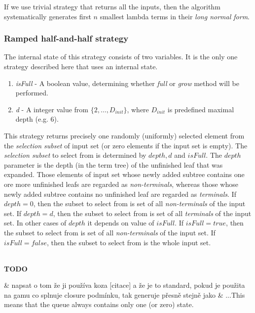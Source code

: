 \documentclass{llncs}
\newcommand{\setDots}[2]{ \lbrace #1 , \dots , #2 \rbrace}
\newenvironment{todo}
{~\\ {\color{red}\textbf{TODO}}
  \begin{easylist}[itemize]}
{ \end{easylist}}
\begin{document}
If we use trivial strategy that returns all the inputs, 
then the algorithm systematically generates 
first $n$ smallest lambda terms in their
\textit{long normal form}.

\subsubsection{Ramped half-and-half strategy}

The internal state of this strategy consists of two variables.
It is the only one strategy described here that uses an internal state.

\begin{enumerate}
 \item \textit{isFull} - A boolean value, determining whether \textit{full}
                     or \textit{grow} method will be performed.
 \item \textit{d} - A integer value from $\setDots{2}{D_{init}}$, where 
                $D_{init}$ is predefined maximal depth (e.g. 6).                    
\end{enumerate}

This strategy returns precisely one randomly
(uniformly) selected  element from 
the \textit{selection subset} of input set
(or zero elements if the input set is empty). 
The \textit{selection subset} 
to select from is determined by $depth, d$ and $isFull$.
The $depth$ parameter is the depth (in the term tree) 
of the unfinished leaf that was expanded.
Those elements of input set whose newly added subtree contains one ore more 
unfinished leafs are regarded as \textit{non-terminals}, whereas 
those whose newly added subtree contains no unfinished leaf are regarded as 
\textit{terminals}.
If $depth = 0$, then the subset to select from is  
set of all \textit{non-terminals} of the input set.
If $depth = d$, then the subset to select from is
set of all \textit{terminals} of the input set.
In other cases of $depth$ it depends on value of $isFull$.
If $isFull = true$, then the subset to select from is 
set of all \textit{non-terminals} of the input set.
If $isFull = false$, then the subset to select from is 
the whole input set.

\begin{todo}
 & napsat o tom že ji používa koza [citace] a že je to standard,
 pokud je použita na gamu co splnuje closure podmínku, tak 
 generuje přesně stejně jako
 & ...This means that the queue always contains only one (or zero) state.
\end{todo}
\end{document}
